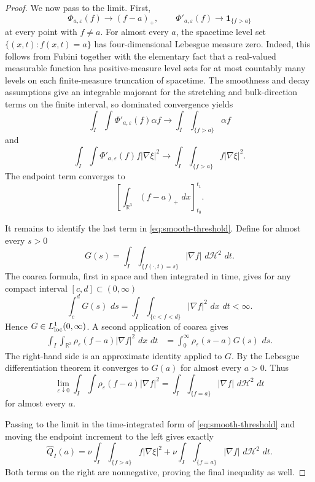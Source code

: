 \documentclass[11pt]{article}
\theoremstyle{definition}\newtheorem{definition}[theorem]{Definition}
\theoremstyle{remark}\newtheorem{remark}[theorem]{Remark}
\newcommand{\R}{\mathbb R}\newcommand{\dd}{\,d}\newcommand{\HH}{\mathcal H}
\newcommand{\Qhat}{\widehat Q}\newcommand{\Qp}{\widehat{\mathfrak Q}}
\begin{document}
\begin{proof}
We now pass to the limit.  First,
\[
\Phi_{a,\varepsilon}(f)\longrightarrow(f-a)_+,
\qquad
\Phi'_{a,\varepsilon}(f)\longrightarrow\mathbf1_{\{f>a\}}
\]
at every point with $f\ne a$.  For almost every $a$, the spacetime level set
$\{(x,t):f(x,t)=a\}$ has four-dimensional Lebesgue measure zero.  Indeed,
this follows from Fubini together with the elementary fact that a real-valued
measurable function has positive-measure level sets for at most countably
many levels on each finite-measure truncation of spacetime.  The smoothness
and decay assumptions give an integrable majorant for the stretching and
bulk-direction terms on the finite interval, so dominated convergence yields
\[
\int_I\!\int\Phi'_{a,\varepsilon}(f)\alpha f
\longrightarrow
\int_I\!\int_{\{f>a\}}\alpha f
\]
and
\[
\int_I\!\int\Phi'_{a,\varepsilon}(f)f|\nabla\xi|^2
\longrightarrow
\int_I\!\int_{\{f>a\}}f|\nabla\xi|^2.
\]
The endpoint term converges to
\[
\left[\int_{\R^3}(f-a)_+\,\dd x\right]_{t_0}^{t_1}.
\]

It remains to identify the last term in \eqref{eq:smooth-threshold}.  Define
for almost every $s>0$
\[
G(s)=\int_I\int_{\{f(\cdot,t)=s\}}|\nabla f|\,\dd\HH^2\,\dd t.
\]
The coarea formula, first in space and then integrated in time, gives for
any compact interval $[c,d]\subset(0,\infty)$
\[
\int_c^dG(s)\,\dd s
=\int_I\int_{\{c<f<d\}}|\nabla f|^2\,\dd x\,\dd t<\infty.
\]
Hence $G\in L^1_{\rm loc}(0,\infty)$.  A second application of coarea gives
\[
\begin{aligned}
\int_I\int_{\R^3}\rho_\varepsilon(f-a)|\nabla f|^2\,\dd x\,\dd t
&=\int_0^\infty\rho_\varepsilon(s-a)G(s)\,\dd s.
\end{aligned}
\]
The right-hand side is an approximate identity applied to $G$.  By the
Lebesgue differentiation theorem it converges to $G(a)$ for almost every
$a>0$.  Thus
\[
\lim_{\varepsilon\downarrow0}
\int_I\int\rho_\varepsilon(f-a)|\nabla f|^2
=
\int_I\int_{\{f=a\}}|\nabla f|\,\dd\HH^2\,\dd t
\]
for almost every $a$.

Passing to the limit in the time-integrated form of
\eqref{eq:smooth-threshold} and moving the endpoint increment to the left gives
exactly
\[
\Qhat_I(a)=
\nu\int_I\int_{\{f>a\}}f|\nabla\xi|^2
+\nu\int_I\int_{\{f=a\}}|\nabla f|\,\dd\HH^2\,\dd t.
\]
Both terms on the right are nonnegative, proving the final inequality as
well.
\end{proof}
\end{document}
